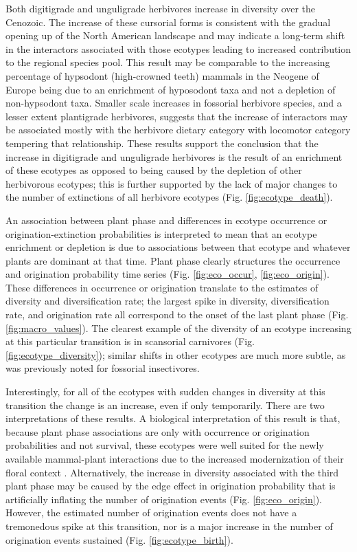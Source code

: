 Both digitigrade and unguligrade herbivores increase in diversity over the Cenozoic. The increase of these cursorial forms is consistent with the gradual opening up of the North American landscape \citep{Blois2009,Stromberg2005,Graham2011a} and may indicate a long-term shift in the interactors associated with those ecotypes leading to increased contribution to the regional species pool. This result may be comparable to the increasing percentage of hypsodont (high-crowned teeth) mammals in the Neogene of Europe being due to an enrichment of hyposodont taxa and not a depletion of non-hypsodont taxa. Smaller scale increases in fossorial herbivore species, and a lesser extent plantigrade herbivores, suggests that the increase of interactors may be associated mostly with the herbivore dietary category with locomotor category tempering that relationship. These results support the conclusion that the increase in digitigrade and unguligrade herbivores is the result of an enrichment of these ecotypes as opposed to being caused by the depletion of other herbivorous ecotypes; this is further supported by the lack of major changes to the number of extinctions of all herbivore ecotypes (Fig. \ref{fig:ecotype_death}).

An association between plant phase and differences in ecotype occurrence or origination-extinction probabilities is interpreted to mean that an ecotype enrichment or depletion is due to associations between that ecotype and whatever plants are dominant at that time. Plant phase clearly structures the occurrence and origination probability time series (Fig. \ref{fig:eco_occur}, \ref{fig:eco_origin}). These differences in occurrence or origination translate to the estimates of diversity and diversification rate; the largest spike in diversity, diversification rate, and origination rate all correspond to the onset of the last plant phase (Fig. \ref{fig:macro_values}). The clearest example of the diversity of an ecotype increasing at this particular transition is in scansorial carnivores (Fig. \ref{fig:ecotype_diversity}); similar shifts in other ecotypes are much more subtle, as was previously noted for fossorial insectivores. 

Interestingly, for all of the ecotypes with sudden changes in diversity at this transition the change is an increase, even if only temporarily. There are two interpretations of these results. A biological interpretation of this result is that, because plant phase associations are only with occurrence or origination probabilities and not survival, these ecotypes were well suited for the newly available mammal-plant interactions due to the increased modernization of their floral context \citep{Graham2011a}. Alternatively, the increase in diversity associated with the third plant phase may be caused by the edge effect in origination probability that is artificially inflating the number of origination events (Fig. \ref{fig:eco_origin}). However, the estimated number of origination events does not have a tremonedous spike at this transition, nor is a major increase in the number of origination events sustained (Fig. \ref{fig:ecotype_birth}).

